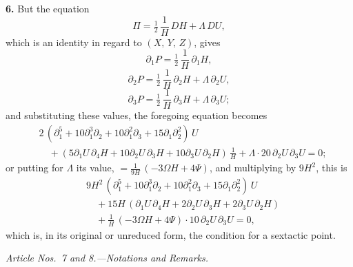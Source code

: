 \documentclass[11pt,a4paper]{article}
\begin{document}
\textbf{6.} But the equation
\[
\Pi = \tfrac{1}{2}\,\frac{1}{H}\,DH + \Lambda\,DU,
\]
which is an identity in regard to $(X,\,Y,\,Z)$, gives
\[
\partial_{1}P = \tfrac{1}{2}\,\frac{1}{H}\,\partial_{1}H,
\]
\[
\partial_{2}P = \tfrac{1}{2}\,\frac{1}{H}\,\partial_{2}H + \Lambda\,\partial_{2}U,
\]
\[
\partial_{3}P = \tfrac{1}{2}\,\frac{1}{H}\,\partial_{3}H + \Lambda\,\partial_{3}U;
\]
and substituting these values, the foregoing equation becomes
\[
\begin{aligned}
&2\,(\partial_{1}^{5} + 10\partial_{1}^{3}\partial_{2} + 10\partial_{1}^{2}\partial_{3} + 15\partial_{1}\partial_{2}^{2})\,U\\
&\quad + (5\partial_{1}U\,\partial_{4}H + 10\partial_{2}U\,\partial_{3}H + 10\partial_{3}U\,\partial_{2}H)\,\frac{1}{H} + \Lambda \cdot 20\,\partial_{2}U\,\partial_{3}U = 0;
\end{aligned}
\]
or putting for $\Lambda$ its value, $= \tfrac{1}{9H}\,(-3\Omega H + 4\Psi)$, and multiplying by $9H^{2}$, this is
\[
\begin{aligned}
&9H^{2}\,(\partial_{1}^{5} + 10\partial_{1}^{3}\partial_{2} + 10\partial_{1}^{2}\partial_{3} + 15\partial_{1}\partial_{2}^{2})\,U\\
&\quad + 15H\,(\partial_{1}U\,\partial_{4}H + 2\partial_{2}U\,\partial_{3}H + 2\partial_{3}U\,\partial_{2}H)\\
&\quad + \tfrac{1}{H}\,(-3\Omega H + 4\Psi) \cdot 10\,\partial_{2}U\,\partial_{3}U = 0,
\end{aligned}
\]
which is, in its original or unreduced form, the condition for a sextactic point.

\bigskip

\begin{center}
\textit{Article Nos.\ 7 and 8.---Notations and Remarks.}
\end{center}
\end{document}
